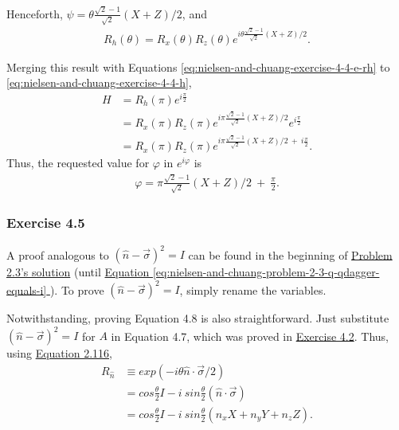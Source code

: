 Henceforth, $\psi = \theta \frac{\sqrt2 - 1}{\sqrt 2} (X + Z) / 2$, and
\begin{align}
    R_h(\theta) = R_x(\theta) R_z(\theta) e^{i \theta \frac{\sqrt2 - 1}{\sqrt 2} (X + Z) / 2}.
\end{align}

Merging this result with Equations
\ref{eq:nielsen-and-chuang-exercise-4-4-e-rh} to \ref{eq:nielsen-and-chuang-exercise-4-4-h},
\begin{align}
    H &= R_h(\pi) e^{i \frac \pi 2} \\
    &= R_x(\pi) R_z(\pi) e^{i \pi \frac{\sqrt2 - 1}{\sqrt 2} (X + Z) / 2} e^{i \frac \pi 2} \\
    &= R_x(\pi) R_z(\pi) e^{i \pi \frac{\sqrt2 - 1}{\sqrt 2} (X + Z) / 2\ +\ i \frac \pi 2}.
\end{align}
Thus, the requested value for $\varphi$ in $e^{i \varphi}$ is
\begin{align}
    \varphi = \pi \frac{\sqrt2 - 1}{\sqrt 2} (X + Z) / 2\ +\ \frac \pi 2.
\end{align}

\subsubsection{Exercise 4.5}
A proof analogous to $(\hat{n} - \vec{\sigma})^2 = I$ can be found in the beginning of
\hyperref[sec:nielsen-and-chuang-problem-2-3]{Problem 2.3's solution}
(until
\hyperref[eq:nielsen-and-chuang-problem-2-3-q-qdagger-equals-i]{
    Equation \ref{eq:nielsen-and-chuang-problem-2-3-q-qdagger-equals-i}
}).
To prove $(\hat{n} - \vec{\sigma})^2 = I$, simply rename the variables.

Notwithstanding, proving Equation 4.8 is also straightforward.
Just substitute $(\hat{n} - \vec{\sigma})^2 = I$ for $A$ in Equation 4.7,
which was proved in \hyperref[sec:nielsen-and-chuang-exercise-4-2]{Exercise 4.2}.
Thus, using \hyperref[sec:nielsen-and-chuang-equation-2-116]{Equation 2.116},
\begin{align}
    R_{\hat{n}} &\equiv exp(-i \theta \hat{n} \cdot \vec{\sigma}/2) \\
    &= cos \frac \theta 2 I - i\ sin \frac \theta 2 (\hat{n} \cdot \vec{\sigma}) \\
    &= cos \frac \theta 2 I - i\ sin \frac \theta 2 (n_x X + n_y Y + n_z Z).
\end{align}
